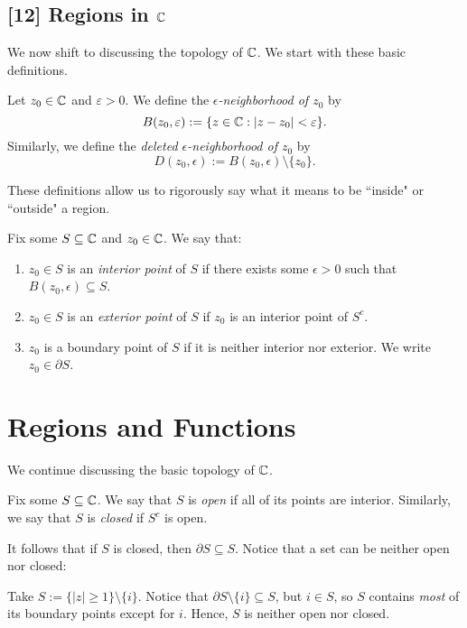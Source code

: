 \documentclass{article}
\begin{document}
\subsection*{[12] Regions in $\mathbb C$}
We now shift to discussing the topology of $\mathbb C$. We start with these basic definitions.
\begin{definition}
Let $z_0\in\mathbb C$ and $\varepsilon>0$. We define the \textit{$\epsilon$-neighborhood of $z_0$} by
$$B(z_0, \varepsilon) := \{z\in \mathbb C: |z-z_0|<\varepsilon\}.$$
Similarly, we define the \textit{deleted $\epsilon$-neighborhood of $z_0$} by
$$D(z_0, \epsilon) := B(z_0, \epsilon) \setminus \{z_0\}.$$
\end{definition}
These definitions allow us to rigorously say what it means to be ``inside" or ``outside" a region.

\begin{definition}
Fix some $S\subseteq \mathbb C$ and $z_0\in \mathbb C$. We say that:
\begin{enumerate}
    \item $z_0\in S$ is an \textit{interior point} of $S$ if there exists some $\epsilon > 0$ such that $B(z_0, \epsilon) \subseteq S$.
    \item $z_0\in S$ is an \textit{exterior point} of $S$ if $z_0$ is an interior point of $S^c$.
    \item $z_0$ is a boundary point of $S$ if it is neither interior nor exterior. We write $z_0 \in \partial S$.
\end{enumerate}
\end{definition}
\newpage
\setcounter{section}{19}
\section{Regions and Functions}
We continue discussing the basic topology of $\mathbb C$.
\begin{definition}
Fix some $S\subseteq \mathbb C$. We say that $S$ is \textit{open} if all of its points are interior. Similarly, we say that $S$ is \textit{closed} if $S^c$ is open.
\end{definition}
It follows that if $S$ is closed, then $\partial S \subseteq S$. Notice that a set can be neither open nor closed:
\begin{example}
Take $S := \{|z|\geq 1\}\setminus \{i\}$. Notice that $\partial S\setminus\{i\}\subseteq S$, but $i\in S$, so $S$ contains \textit{most} of its boundary points except for $i$. Hence, $S$ is neither open nor closed.
\end{example}
\end{document}
